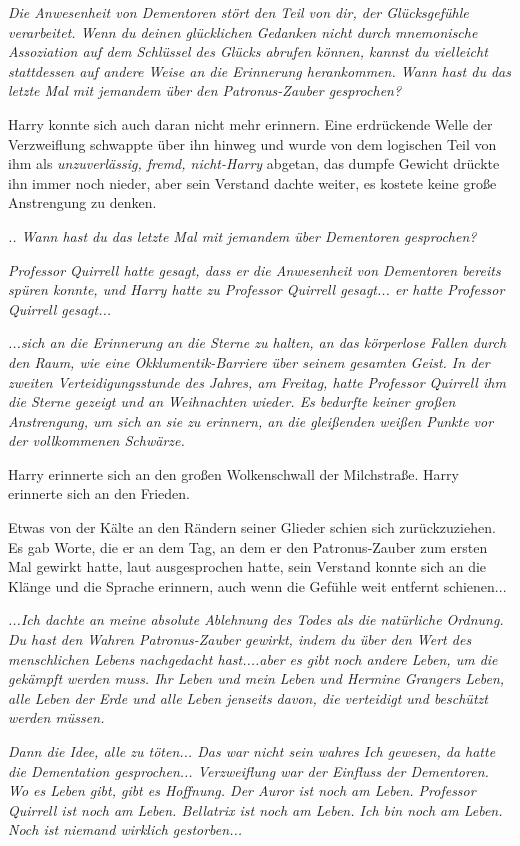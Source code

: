 {\emph{Die Anwesenheit von Dementoren stört den Teil von dir, der Glücksgefühle verarbeitet. Wenn du deinen glücklichen Gedanken nicht durch mnemonische Assoziation auf dem Schlüssel des Glücks abrufen können, kannst du vielleicht stattdessen auf andere Weise an die Erinnerung herankommen. Wann hast du das letzte Mal mit jemandem über den Patronus-Zauber gesprochen?}

Harry konnte sich auch daran nicht mehr erinnern. Eine erdrückende Welle der Verzweiflung schwappte über ihn hinweg und wurde von dem logischen Teil von ihm als \emph{unzuverlässig, fremd, nicht-Harry} abgetan, das dumpfe Gewicht drückte ihn immer noch nieder, aber sein Verstand dachte weiter, es kostete keine große Anstrengung zu denken.

\emph{.. Wann hast du das letzte Mal mit jemandem über Dementoren gesprochen?}

\emph{Professor Quirrell hatte gesagt, dass er die Anwesenheit von Dementoren bereits spüren konnte, und Harry hatte zu Professor Quirrell gesagt... er hatte Professor Quirrell gesagt...}

\emph{...sich an die Erinnerung an die Sterne zu halten, an das körperlose Fallen durch den Raum, wie eine Okklumentik-Barriere über seinem gesamten Geist. In der zweiten Verteidigungsstunde des Jahres, am Freitag, hatte Professor Quirrell ihm die Sterne gezeigt und an Weihnachten wieder. Es bedurfte keiner großen Anstrengung, um sich an sie zu erinnern, an die gleißenden weißen Punkte vor der vollkommenen Schwärze.}

Harry erinnerte sich an den großen Wolkenschwall der Milchstraße. Harry erinnerte sich an den Frieden.

Etwas von der Kälte an den Rändern seiner Glieder schien sich zurückzuziehen. Es gab Worte, die er an dem Tag, an dem er den Patronus-Zauber zum ersten Mal gewirkt hatte, laut ausgesprochen hatte, sein Verstand konnte sich an die Klänge und die Sprache erinnern, auch wenn die Gefühle weit entfernt schienen...

\emph{...Ich dachte an meine absolute Ablehnung des Todes als die natürliche Ordnung. Du hast den Wahren Patronus-Zauber gewirkt, indem du über den Wert des menschlichen Lebens nachgedacht hast....aber es gibt noch andere Leben, um die gekämpft werden muss. Ihr Leben und mein Leben und Hermine Grangers Leben, alle Leben der Erde und alle Leben jenseits davon, die verteidigt und beschützt werden müssen.}

\emph{Dann die Idee, alle zu töten... Das war nicht sein wahres Ich gewesen, da hatte die Dementation gesprochen... Verzweiflung war der Einfluss der Dementoren. Wo es Leben gibt, gibt es Hoffnung. Der Auror ist noch am Leben. Professor Quirrell ist noch am Leben. Bellatrix ist noch am Leben. Ich bin noch am Leben. Noch ist niemand wirklich gestorben...}

}
